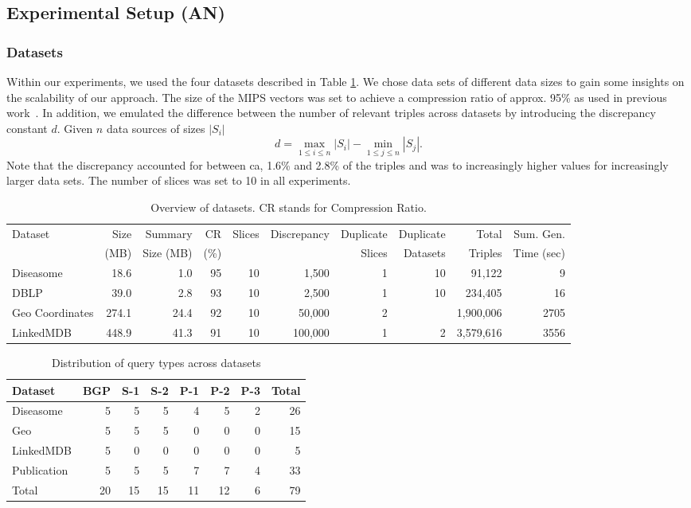 \documentclass{sig-alternate}  %
\begin{document}
\subsection{Experimental Setup (AN)}

\subsubsection{Datasets}
Within our experiments, we used the four datasets described in Table \ref{tab:datasets}.
We chose data sets of different data sizes to gain some insights on the scalability of our approach.
The size of the MIPS vectors was set to achieve a compression ratio of approx. 95\% as used in previous work~\cite{QTREE}.
In addition, we emulated the difference between the number of relevant triples across datasets by introducing the discrepancy constant $d$.
Given $n$ data sources of sizes $|S_i|$
\begin{equation}
d = \max\limits_{1 \leq i \leq n} |S_i| - \min\limits_{1 \leq j \leq n} |S_j|.
\end{equation}
Note that the discrepancy accounted for between ca, 1.6\% and 2.8\% of the triples and was to increasingly higher values for increasingly larger data sets.
The number of slices was set to 10 in all experiments.
\begin{table}
\centering
\begin{tabular}{lrrrrrrrrr}
\hline
Dataset & Size  & Summary 	& CR   & Slices & Discrepancy & Duplicate  & Duplicate & Total 	& Sum. Gen. \\
				& (MB) 	& Size (MB) & (\%) &	  		 &  					 & Slices 		& Datasets 	& Triples & Time (sec)\\
\hline
Diseasome 			& 18.6 	& 1.0 	& 95 & 10 & 1,500 		& 1 & 10 			& 91,122 & 9\\
DBLP 						& 39.0	& 2.8 	& 93 & 10 & 2,500 		& 1 & 10 			& 234,405 & 16\\
Geo Coordinates & 274.1 & 24.4 	& 92 & 10 & 50,000 	& 2 & 				& 1,900,006 & 2705\\
LinkedMDB 			& 448.9 & 41.3 	& 91 & 10 & 100,000 	& 1 & 2 			& 3,579,616 & 3556\\
\hline
\end{tabular}
\caption{Overview of datasets. CR stands for Compression Ratio.}
\label{tab:datasets}
\end{table}

\begin{table}
\centering
\begin{tabular}{lrrrrrrr}
\hline
Dataset 		& BGP  & S-1 & S-2 & P-1 & P-2 & P-3 & Total \\\hline
Diseasome 			& 5 & 5 & 5 & 4 & 5 & 2 & 26 \\
Geo  & 5 & 5 & 5 & 0 & 0 & 0 & 15 \\
LinkedMDB 			& 5 & 0 & 0 & 0 & 0 & 0 & 5 \\
Publication 		& 5 & 5 & 5 & 7 & 7 & 4 & 33 \\\hline
Total 					& 20 & 15 & 15 & 11 & 12 & 6 & 79\\
\hline
\end{tabular}
\caption{Distribution of query types across datasets}
\label{tab:queries}
\end{table}
\end{document}
